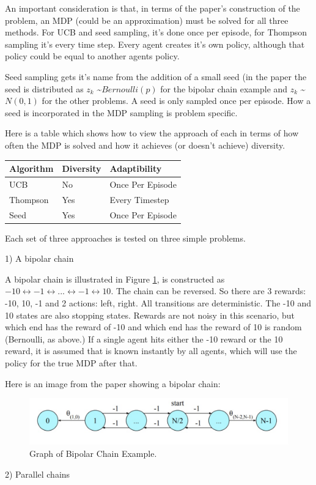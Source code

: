 \documentclass{article}
\begin{document}
An important consideration is that, in terms of the paper's construction of the problem, an MDP (could be an approximation) must be solved for all three methods. For UCB and seed sampling, it's done once per episode, for Thompson sampling it's every time step. Every agent creates it's own policy, although that policy could be equal to another agents policy.

Seed sampling gets it's name from the addition of a small seed (in the paper the seed is distributed as $z_k$  \textasciitilde $Bernoulli(p)$ for the bipolar chain example and $z_k$ \textasciitilde $N(0,1)$ for the other problems.  A seed is only sampled once per episode. How a seed is incorporated in the MDP sampling is problem specific.

Here is a table which shows how to view the approach of each in terms of how often the MDP is solved and how it achieves (or doesn't achieve) diversity.

\begin{table}[ht]
\centering
\begin{tabular}{|lll|} 
\hline 
Algorithm   & Diversity & Adaptibility \\ 
\hline 
UCB     & No       & Once Per Episode \\ 
Thompson     & Yes      & Every Timestep \\ 
Seed     & Yes       & Once Per Episode \\ 
   \hline
\end{tabular}
\end{table}

Each set of three approaches is tested on three simple problems.

1) A bipolar chain

A bipolar chain is illustrated in Figure \ref{fig:bipolarchain}, is constructed as $-10 \longleftrightarrow -1 \longleftrightarrow ... \longleftrightarrow -1 \longleftrightarrow 10$. The chain can be reversed. So there are 3 rewards: -10, 10, -1 and 2 actions: left, right. All transitions are deterministic. The -10 and 10 states are also stopping states. Rewards are not noisy in this scenario, but which end has the reward of -10 and which end has the reward of 10 is random (Bernoulli, as above.) If a single agent hits either the -10 reward or the 10 reward, it is assumed that is known instantly by all agents, which will use the policy for the true MDP after that. 

Here is an image from the paper showing a bipolar chain:

\begin{figure}[htbp!]
  \centering
\includegraphics[scale=.25]{bipolarchain.png}

  \caption{Graph of Bipolar Chain Example.}
 \label{fig:bipolarchain}
\end{figure}
2) Parallel chains
\end{document}
